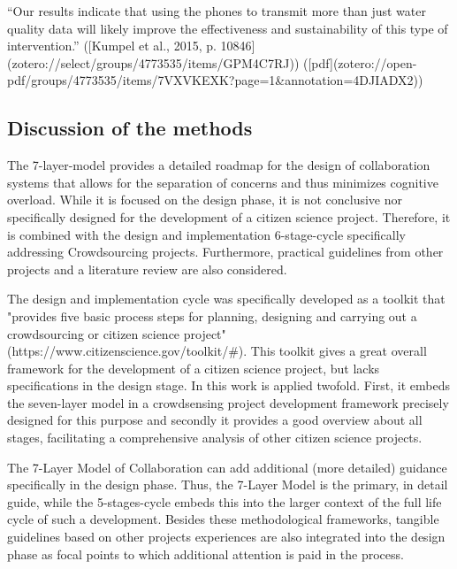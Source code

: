 “Our results indicate that using the phones to transmit more than just water quality data will likely improve the effectiveness and sustainability of this type of intervention.” ([Kumpel et al., 2015, p. 10846](zotero://select/groups/4773535/items/GPM4C7RJ)) ([pdf](zotero://open-pdf/groups/4773535/items/7VXVKEXK?page=1&annotation=4DJIADX2))




\subsection{Discussion of the methods}
The 7-layer-model provides a detailed roadmap for the design of collaboration systems that allows for the separation of concerns and thus minimizes cognitive overload. While it is focused on the design phase, it is not conclusive nor specifically designed for the development of a citizen science project. Therefore, it is combined with the design and implementation 6-stage-cycle specifically addressing Crowdsourcing projects. Furthermore, practical guidelines from other projects and a literature review are also considered.

The design and implementation cycle was specifically developed as a toolkit that "provides five basic process steps for planning, designing and carrying out a crowdsourcing or citizen science project" (https://www.citizenscience.gov/toolkit/#). This toolkit gives a great overall framework for the development of a citizen science project, but lacks specifications in the design stage. In this work is applied twofold. First, it embeds the seven-layer model in a crowdsensing project development framework precisely designed for this purpose and secondly it provides a good overview about all stages, facilitating a comprehensive analysis of other citizen science projects. 


The 7-Layer Model of Collaboration can add additional (more detailed) guidance specifically in the design phase. Thus, the 7-Layer Model is the primary, in detail guide, while the 5-stages-cycle embeds this into the larger context of the full life cycle of such a development.
Besides these methodological frameworks, tangible guidelines based on other projects experiences are also integrated into the design phase as focal points to which additional attention is paid in the process.

